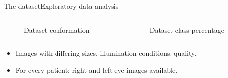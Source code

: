 \documentclass{beamer}
\begin{document}
\begin{frame}{The dataset}{Exploratory data analysis}
	\begin{columns}
		\begin{column}{0.5\textwidth}
			\begin{figure}[p]
				\caption{Dataset conformation}
			\end{figure}	
		\end{column}
		\begin{column}{0.4\textwidth}  %
			\begin{figure}[p]
				\caption{Dataset class percentage}
			\end{figure}
		\end{column}
	\end{columns}	
	\begin{itemize}
		\item Images with differing sizes, illumination conditions, quality.\\ 
		\item For every patient: right and left eye images available.
	\end{itemize}
\end{frame}
\end{document}
